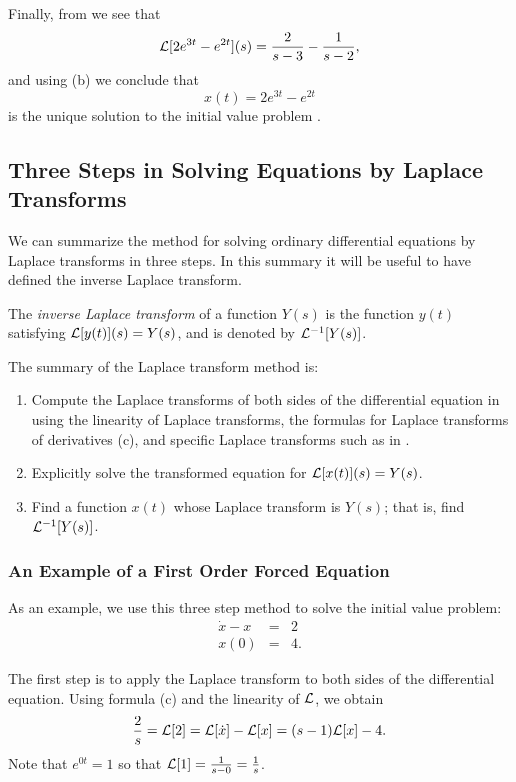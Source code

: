 \documentclass{ximera}
\begin{document}
Finally, from  we see that 
\[
{\cal L}[2e^{3t}-e^{2t}](s) = \frac{2}{s-3} - \frac{1}{s-2},
\]
and using (b) we conclude that
\[
x(t) = 2e^{3t}-e^{2t} 
\]
is the unique solution to the initial value problem . 

\subsection*{Three Steps in Solving Equations by Laplace Transforms} 

We can summarize the method for solving ordinary differential equations by
Laplace transforms in three steps.  In this summary it will be useful to 
have defined the inverse Laplace transform.
\begin{Def}  \label{D:invLaplace}
The {\em inverse Laplace transform\/} of a function $Y(s)$ is the function 
$y(t)$ satisfying ${\cal L}[y(t)](s) = Y(s)$, and is denoted by  
${\cal L}^{-1}[Y(s)]$.
\end{Def}

The summary of the Laplace transform method is: 
\begin{enumerate}
\item	Compute the Laplace transforms of both sides of the differential 
equation in  using the linearity of Laplace transforms, the 
formulas for Laplace transforms of derivatives (c), and specific 
Laplace transforms such as in .
\item	Explicitly solve the transformed equation for 
${\cal L}[x(t)](s)=Y(s)$.
\item	Find a function $x(t)$ whose Laplace transform is $Y(s)$; that is, 
find ${\cal L}^{-1}[Y(s)]$.
\end{enumerate}

\subsubsection*{An Example of a First Order Forced Equation}

As an example, we use this three step method to solve the initial value 
problem:
\begin{equation}  \label{eq:dxx2}
\begin{array}{rcl}
\dot x - x & = & 2\\
  x(0) & = & 4.
\end{array}
\end{equation}

The first step is to apply the Laplace transform to both sides of the 
differential equation.  Using formula (c) and the linearity of 
${\cal L}$, we obtain
\[
\frac{2}{s} = {\cal L}[2] = {\cal L}[\dot x]-{\cal L}[x] = 
(s-1){\cal L}[x]-4.
\]
Note that $e^{0t}=1$ so that ${\cal L}[1] = \frac{1}{s-0}=\frac{1}{s}$.
\end{document}
